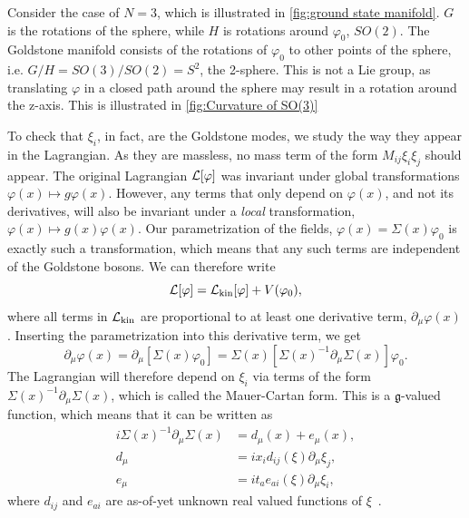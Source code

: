 Consider the case of $N = 3$, which is illustrated in \autoref{fig:ground state manifold}.
$G$ is the rotations of the sphere, while $H$ is rotations around $\varphi_0$, $SO(2)$.
The Goldstone manifold consists of the rotations of $\varphi_0$ to other points of the sphere, i.e. $G/H = SO(3)/SO(2) = S^2$, the 2-sphere.
This is not a Lie group, as translating $\varphi$ in a closed path around the sphere may result in a rotation around the z-axis.
This is illustrated in \autoref{fig:Curvature of SO(3)}


To check that $\xi_i$, in fact, are the Goldstone modes, we study the way they appear in the Lagrangian.
As they are massless, no mass term of the form $M_{ij} \xi_i \xi_j$ should appear.
The original Lagrangian $\mathcal{L}[\varphi]$ was invariant under global transformations $\varphi(x) \mapsto g \varphi(x)$.
However, any terms that only depend on $\varphi(x)$, and not its derivatives, will also be invariant under a \emph{local} transformation, $\varphi(x) \mapsto g(x)\varphi(x)$.
Our parametrization of the fields, $\varphi(x) = \Sigma(x)\varphi_0$ is exactly such a transformation, which means that any such terms are independent of the Goldstone bosons.
We can therefore write
\begin{equation}
    \mathcal{L}[\varphi] = \mathcal{L}_{\mathrm{kin}}[\varphi] + V(\varphi_0),
\end{equation}
where all terms in $\mathcal{L}_{\mathrm{kin}}$ are proportional to at least one derivative term, $\partial_\mu \varphi(x)$.
Inserting the parametrization into this derivative term, we get
\begin{equation}
    \partial_\mu \varphi(x) = \partial_\mu [\Sigma(x) \varphi_0]
    = \Sigma(x) [\Sigma(x)^{-1} \partial_{\mu} \Sigma(x)] \varphi_0.
\end{equation}
The Lagrangian will therefore depend on $\xi_i$ via terms of the form $\Sigma(x)^{-1}\partial_\mu \Sigma(x)$, which is called the Mauer-Cartan form.
This is a $\mathfrak g$-valued function, which means that it can be written as
\begin{align}
    i\Sigma(x)^{-1}\partial_\mu \Sigma(x) & 
    = d_{\mu}(x) + e_{\mu}(x), \\
    d_{\mu} & = i x_i d_{ij}(\xi) \partial_\mu \xi_j, \\
    e_{\mu} & = i t_a e_{ai}(\xi)\partial_\mu \xi_i,
\end{align}
where $d_{ij}$ and $e_{ai}$ are as-of-yet unknown real valued functions of $\xi$~\cite{weinberg_1996_vol2,Watanabe:effective_lagrangian}.

